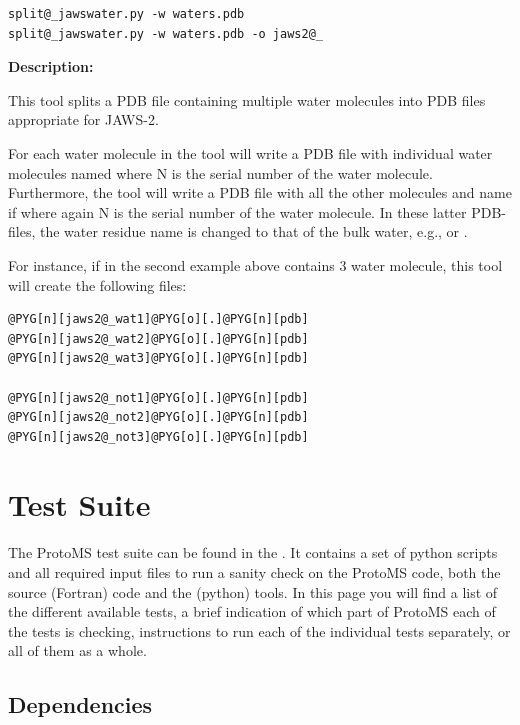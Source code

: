 \documentclass[letterpaper,10pt,english]{manual}
\begin{document}
\begin{Verbatim}[commandchars=@\[\]]
split@_jawswater.py -w waters.pdb
split@_jawswater.py -w waters.pdb -o jaws2@_
\end{Verbatim}

\textbf{Description:}

This tool splits a PDB file containing multiple water molecules into PDB files appropriate for JAWS-2.

For each water molecule in  the tool will write a PDB file with individual water molecules named  where N is the serial number of the water molecule. Furthermore, the tool will write a PDB file with all the other molecules and name if  where again N is the serial number of the water molecule. In these latter PDB-files, the water residue name is changed to that of the bulk water, e.g.,  or .

For instance, if  in the second example above contains 3 water molecule, this tool will create the following files:

\begin{Verbatim}[commandchars=@\[\]]
@PYG[n][jaws2@_wat1]@PYG[o][.]@PYG[n][pdb]
@PYG[n][jaws2@_wat2]@PYG[o][.]@PYG[n][pdb]
@PYG[n][jaws2@_wat3]@PYG[o][.]@PYG[n][pdb]

@PYG[n][jaws2@_not1]@PYG[o][.]@PYG[n][pdb]
@PYG[n][jaws2@_not2]@PYG[o][.]@PYG[n][pdb]
@PYG[n][jaws2@_not3]@PYG[o][.]@PYG[n][pdb]
\end{Verbatim}

\resetcurrentobjects
\hypertarget{--doc-testsuite}{}

\chapter{Test Suite}

The ProtoMS test suite can be found in the . It contains a set of python scripts and all required input files to run a sanity check on the ProtoMS code, both the source (Fortran) code and the (python) tools. In this page you will find a list of the different available tests, a brief indication of which part of ProtoMS each of the tests is checking, instructions to run each of the individual tests separately, or all of them as a whole.


\section{Dependencies}
\end{document}

